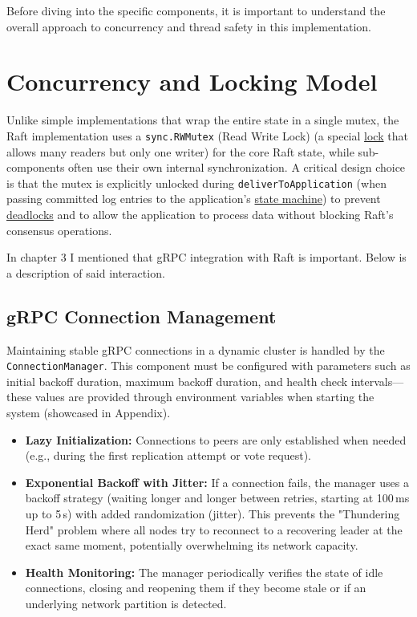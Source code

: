 \documentclass[shortabstract]{iithesis}
\begin{document}
Before diving into the specific components, it is important to understand the overall approach to concurrency and thread safety in this implementation.

\section{Concurrency and Locking Model}
Unlike simple implementations that wrap the entire state in a single mutex, the Raft implementation uses a \texttt{sync.RWMutex} (Read Write Lock) (a special \hyperref[def:mutex]{lock} that allows many readers but only one writer) for the core Raft state, while sub-components often use their own internal synchronization. A critical design choice is that the mutex is explicitly unlocked during \texttt{deliverToApplication} (when passing committed log entries to the application's \hyperref[def:statemachine]{state machine}) to prevent \hyperref[def:deadlock]{deadlocks} and to allow the application to process data without blocking Raft's consensus operations.

In chapter 3 I mentioned that gRPC integration with Raft is important. Below is a description of said interaction.

\subsection{gRPC Connection Management}
Maintaining stable gRPC connections in a dynamic cluster is handled by the \\ \texttt{ConnectionManager}. This component must be configured with parameters such as initial backoff duration, maximum backoff duration, and health check intervals—these values are provided through environment variables when starting the system (showcased in Appendix).
\begin{itemize}
    \item \textbf{Lazy Initialization:} Connections to peers are only established when needed (e.g., during the first replication attempt or vote request).
    \item \textbf{Exponential Backoff with Jitter:} If a connection fails, the manager uses a backoff strategy (waiting longer and longer between retries, starting at 100\,ms up to 5\,s) with added randomization (jitter). This prevents the "Thundering Herd" problem where all nodes try to reconnect to a recovering leader at the exact same moment, potentially overwhelming its network capacity.
    \item \textbf{Health Monitoring:} The manager periodically verifies the state of idle connections, closing and reopening them if they become stale or if an underlying network partition is detected.
\end{itemize}
\end{document}
